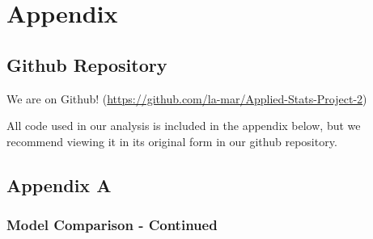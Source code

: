 \chapter{Appendix}\label{chap:appendix}

\section{Github Repository}\label{github}

We are on Github! (\url{https://github.com/la-mar/Applied-Stats-Project-2})

All code used in our analysis is included in the appendix below, but we recommend viewing it in its original form in our github repository.

\section{Appendix A}\label{appendix-a}



\subsection{Model Comparison - Continued}\label{moremodelcomp}

\begin{figure}[!hb]
\end{figure}

\begin{figure}[!hb]
\end{figure}


